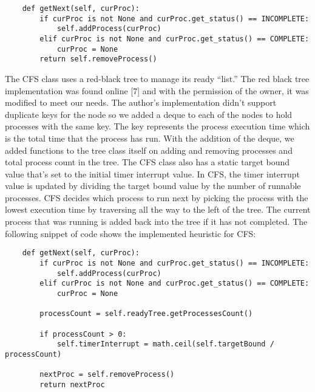 \documentclass[a4paper]{article}
\begin{document}

\begin{lstlisting}
    def getNext(self, curProc):
        if curProc is not None and curProc.get_status() == INCOMPLETE:
            self.addProcess(curProc)
        elif curProc is not None and curProc.get_status() == COMPLETE:
            curProc = None
        return self.removeProcess()
\end{lstlisting}

The CFS class uses a red-black tree to manage its ready “list.” The red black tree implementation was found online [7] and with the permission of the owner, it was modified to meet our needs. The author’s implementation didn’t support duplicate keys for the node so we added a deque to each of the nodes to hold processes with the same key. The key represents the process execution time which is the total time that the process has run. With the addition of the deque, we added functions to the tree class itself on adding and removing processes and total process count in the tree. The CFS class also has a static target bound value that’s set to the initial timer interrupt value. In CFS, the timer interrupt value is updated by dividing the target bound value by the number of runnable processes. CFS decides which process to run next by picking the process with the lowest execution time by traversing all the way to the left of the tree. The current process that was running is added back into the tree if it has not completed. The following snippet of code shows the implemented heuristic for CFS:

\begin{lstlisting}
    def getNext(self, curProc):
        if curProc is not None and curProc.get_status() == INCOMPLETE:
            self.addProcess(curProc)
        elif curProc is not None and curProc.get_status() == COMPLETE:
            curProc = None
        
        processCount = self.readyTree.getProcessesCount()
       
        if processCount > 0:
            self.timerInterrupt = math.ceil(self.targetBound / processCount)
        
        nextProc = self.removeProcess()
        return nextProc
\end{lstlisting}
\end{document}
